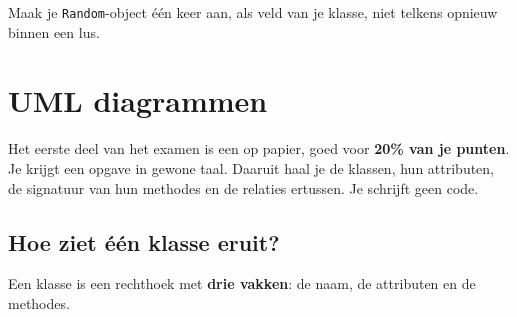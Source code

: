 \documentclass[a4paper,11pt]{article}
\begin{document}
\begin{examenbox}
    Maak je \texttt{Random}-object \'e\'en keer aan, als veld van je klasse, niet
    telkens opnieuw binnen een lus.
\end{examenbox}

\section{UML diagrammen}
\label{sec:uml}

Het eerste deel van het examen is een  op papier,
goed voor \textbf{20\% van je punten}. Je krijgt een opgave in gewone taal. Daaruit
haal je de klassen, hun attributen, de signatuur van hun methodes en de relaties
ertussen. Je schrijft geen code.

\subsection{Hoe ziet \'e\'en klasse eruit?}

Een klasse is een rechthoek met \textbf{drie vakken}: de naam, de attributen en
de methodes.

\begin{center}
\end{center}
\end{document}
